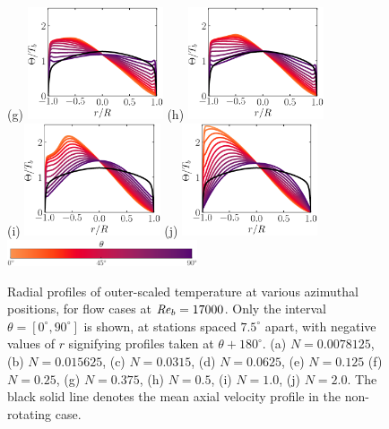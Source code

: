 \documentclass[lineno]{jfm}
\begin{document}
\begin{figure}
                (g) \includegraphics[width=4cm]{Figures/prof_tttb_rotz0_roty0.1875.eps}
                (h) \includegraphics[width=4cm]{Figures/prof_tttb_rotz0_roty0.25.eps} \\
                (i) \includegraphics[width=4cm]{Figures/prof_tttb_rotz0_roty0.5.eps}
                (j) \includegraphics[width=4cm]{Figures/prof_tttb_rotz0_roty1.0.eps} \\
                \includegraphics[width=0.5\textwidth]{Figures/theta_cmap_half.eps}
                \caption{
                Radial profiles of
                outer-scaled temperature
                at various azimuthal positions,
                for flow cases at $\mbox{\textit{Re}}_b=17000$.
                Only the interval $\theta = [0^{\circ},90^{\circ}]$ is shown, at stations
                spaced $7.5^\circ$ apart, with negative values of $r$ signifying profiles
                taken at $\theta + 180^{\circ}$.
                (a) $N = 0.0078125$,
                (b) $N = 0.015625$,
                (c) $N = 0.0315$,
                (d) $N = 0.0625$,
                (e) $N = 0.125$
                (f) $N = 0.25$,
                (g) $N = 0.375$,
                (h) $N = 0.5$,
                (i) $N = 1.0$,
                (j) $N = 2.0$.
                The black solid line denotes the mean axial velocity profile in the
                non-rotating case.
        }
        \label{fig:tprof}
        \end{figure}
\end{document}
